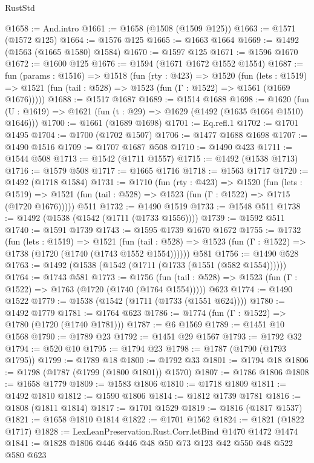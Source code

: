\begin{lexlean}{RustStd}
\begin{coremodule}
{\begin{coremodule}
{{{{{{{{{{{{{@1658 := And.intro
@1661 := @1658 (@1508 (@1509 @125))
@1663 := @1571 (@1572 @125)
@1664 := @1576 @125
@1665 := @1663 @1664
@1669 := @1492 (@1563 (@1665 @1580) @1584)
@1670 := @1597 @125
@1671 := @1596 @1670
@1672 := @1600 @125
@1676 := @1594 (@1671 @1672 @1552 @1554)
@1687 := fun (params : @1516) =>
  @1518
    (fun (rty : @423) =>
    @1520
      (fun (lets : @1519) =>
      @1521 (fun (tail : @528) => @1523 (fun (Γ : @1522) => @1561 (@1669 @1676)))))
@1688 := @1517 @1687
@1689 := @1514 @1688
@1698 := @1620 (fun (U : @1619) => @1621 (fun (t : @29) => @1629 (@1492 (@1635 @1664 @1510) @1646)))
@1700 := @1661 (@1689 @1698)
@1701 := Eq.refl.{1}
@1702 := @1701 @1495
@1704 := @1700 (@1702 @1507)
@1706 := @1477 @1688 @1698
@1707 := @1490 @1516
@1709 := @1707 @1687 @508
@1710 := @1490 @423
@1711 := @1544 @508
@1713 := @1542 (@1711 @1557)
@1715 := @1492 (@1538 @1713)
@1716 := @1579 @508
@1717 := @1665 @1716
@1718 := @1563 @1717
@1720 := @1492 (@1718 @1584)
@1731 := @1710
    (fun (rty : @423) =>
    @1520
      (fun (lets : @1519) =>
      @1521 (fun (tail : @528) => @1523 (fun (Γ : @1522) => @1715 (@1720 @1676)))))
    @511
@1732 := @1490 @1519
@1733 := @1548 @511
@1738 := @1492 (@1538 (@1542 (@1711 (@1733 @1556))))
@1739 := @1592 @511
@1740 := @1591 @1739
@1743 := @1595 @1739 @1670 @1672
@1755 := @1732
    (fun (lets : @1519) =>
    @1521
      (fun (tail : @528) => @1523 (fun (Γ : @1522) => @1738 (@1720 (@1740 (@1743 @1552 @1554))))))
    @581
@1756 := @1490 @528
@1763 := @1492 (@1538 (@1542 (@1711 (@1733 (@1551 (@582 @1554))))))
@1764 := @1743 @581
@1773 := @1756
    (fun (tail : @528) => @1523 (fun (Γ : @1522) => @1763 (@1720 (@1740 (@1764 @1554)))))
    @623
@1774 := @1490 @1522
@1779 := @1538 (@1542 (@1711 (@1733 (@1551 @624))))
@1780 := @1492 @1779
@1781 := @1764 @623
@1786 := @1774 (fun (Γ : @1522) => @1780 (@1720 (@1740 @1781)))
@1787 := @6 @1569
@1789 := @1451 @10 @1568
@1790 := @1789 @23
@1792 := @1451 @29 @1567
@1793 := @1792 @32
@1794 := @520 @10
@1795 := @1794 @23
@1798 := @1787 (@1790 (@1793 @1795))
@1799 := @1789 @18
@1800 := @1792 @33
@1801 := @1794 @18
@1806 := @1798 (@1787 (@1799 (@1800 @1801)) @1570)
@1807 := @1786 @1806
@1808 := @1658 @1779
@1809 := @1583 @1806
@1810 := @1718 @1809
@1811 := @1492 @1810
@1812 := @1590 @1806
@1814 := @1812 @1739 @1781
@1816 := @1808 (@1811 @1814)
@1817 := @1701 @1529
@1819 := @1816 (@1817 @1537)
@1821 := @1658 @1810 @1814
@1822 := @1701 @1562
@1824 := @1821 (@1822 @1717)
@1828 := LexLeanPreservation.Rust.Corr.letBind @1470 @1472 @1474
@1841 := @1828 @1806 @446 @446 @48 @50 @73 @123 @42 @550 @48 @522 @580 @623
}}}}}}}}}}}}}
\end{coremodule}}
\end{coremodule}
\end{lexlean}
